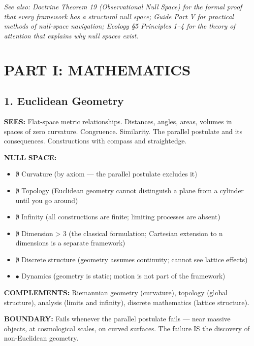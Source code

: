 \textit{See also: Doctrine Theorem 19 (Observational Null Space) for the formal proof that every framework has a structural null space; Guide Part V for practical methods of null-space navigation; Ecology §5 Principles 1–4 for the theory of attention that explains why null spaces exist.}


\bigskip\noindent\makebox[\textwidth]{\color{rulegray}\rule{5cm}{0.3pt}}\bigskip


\chapter*{PART I: MATHEMATICS}


\section*{1. Euclidean Geometry}


\textbf{SEES:} Flat-space metric relationships. Distances, angles, areas, volumes in spaces of zero curvature. Congruence. Similarity. The parallel postulate and its consequences. Constructions with compass and straightedge.


\textbf{NULL SPACE:}

\begin{itemize}[nosep,leftmargin=*]
  \item $\emptyset$ Curvature (by axiom — the parallel postulate excludes it)
  \item $\emptyset$ Topology (Euclidean geometry cannot distinguish a plane from a cylinder until you go around)
  \item $\emptyset$ Infinity (all constructions are finite; limiting processes are absent)
  \item $\emptyset$ Dimension > 3 (the classical formulation; Cartesian extension to n dimensions is a separate framework)
  \item $\emptyset$ Discrete structure (geometry assumes continuity; cannot see lattice effects)
  \item $\bullet$ Dynamics (geometry is static; motion is not part of the framework)
\end{itemize}


\textbf{COMPLEMENTS:} Riemannian geometry (curvature), topology (global structure), analysis (limits and infinity), discrete mathematics (lattice structure).


\textbf{BOUNDARY:} Fails whenever the parallel postulate fails — near massive objects, at cosmological scales, on curved surfaces. The failure IS the discovery of non-Euclidean geometry.



